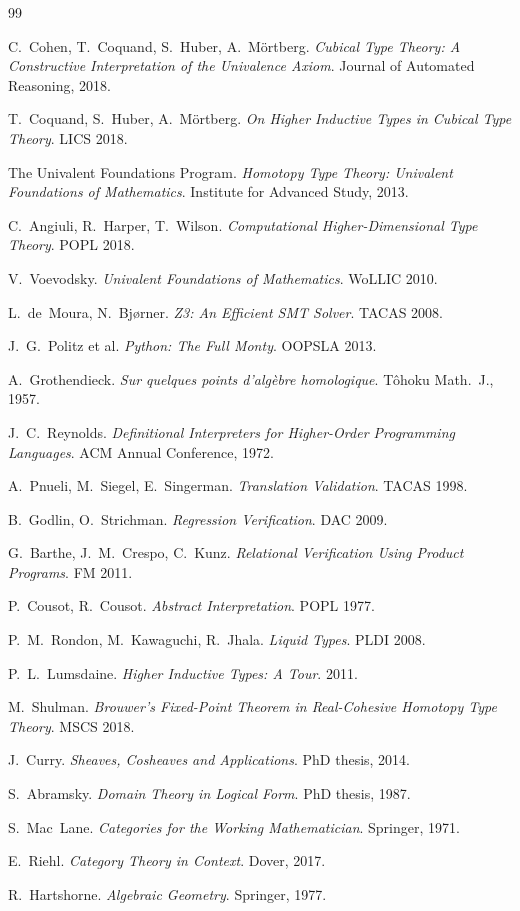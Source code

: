 \begin{thebibliography}{99}

C.~Cohen, T.~Coquand, S.~Huber, A.~M\"ortberg.
\emph{Cubical Type Theory: A Constructive Interpretation of the
  Univalence Axiom}.
Journal of Automated Reasoning, 2018.

T.~Coquand, S.~Huber, A.~M\"ortberg.
\emph{On Higher Inductive Types in Cubical Type Theory}.
LICS 2018.

The Univalent Foundations Program.
\emph{Homotopy Type Theory: Univalent Foundations of Mathematics}.
Institute for Advanced Study, 2013.

C.~Angiuli, R.~Harper, T.~Wilson.
\emph{Computational Higher-Dimensional Type Theory}.
POPL 2018.

V.~Voevodsky.
\emph{Univalent Foundations of Mathematics}.
WoLLIC 2010.

L.~de~Moura, N.~Bj{\o}rner.
\emph{Z3: An Efficient SMT Solver}.
TACAS 2008.

J.~G.~Politz et al.
\emph{Python: The Full Monty}.
OOPSLA 2013.

A.~Grothendieck.
\emph{Sur quelques points d'alg\`ebre homologique}.
T\^ohoku Math.\ J., 1957.

J.~C.~Reynolds.
\emph{Definitional Interpreters for Higher-Order Programming Languages}.
ACM Annual Conference, 1972.

A.~Pnueli, M.~Siegel, E.~Singerman.
\emph{Translation Validation}.
TACAS 1998.

B.~Godlin, O.~Strichman.
\emph{Regression Verification}.
DAC 2009.

G.~Barthe, J.~M.~Crespo, C.~Kunz.
\emph{Relational Verification Using Product Programs}.
FM 2011.

P.~Cousot, R.~Cousot.
\emph{Abstract Interpretation}.
POPL 1977.

P.~M.~Rondon, M.~Kawaguchi, R.~Jhala.
\emph{Liquid Types}.
PLDI 2008.

P.~L.~Lumsdaine.
\emph{Higher Inductive Types: A Tour}.
2011.

M.~Shulman.
\emph{Brouwer's Fixed-Point Theorem in Real-Cohesive Homotopy Type Theory}.
MSCS 2018.

J.~Curry.
\emph{Sheaves, Cosheaves and Applications}.
PhD thesis, 2014.

S.~Abramsky.
\emph{Domain Theory in Logical Form}.
PhD thesis, 1987.

S.~Mac~Lane.
\emph{Categories for the Working Mathematician}.
Springer, 1971.

E.~Riehl.
\emph{Category Theory in Context}.
Dover, 2017.

R.~Hartshorne.
\emph{Algebraic Geometry}.
Springer, 1977.

\end{thebibliography}
